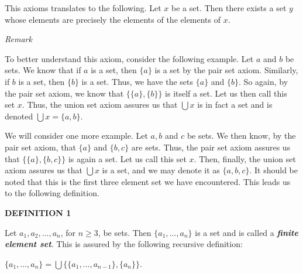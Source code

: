 \documentclass[12pt, a4paper]{article}
\begin{document}
\vspace{4mm}

\noindent This axioms translates to the following. Let $x$ be a set. Then there exists a set $y$ whose elements are precisely the elements of the elements of $x$.\par

\vspace{6mm}

\noindent\large{\textit{Remark}}\normalsize\par

\vspace{4mm}

\noindent To better understand this axiom, consider the following example. Let $a$ and $b$ be sets. We know that if $a$ is a set, then $\{a\}$ is a set by the pair set axiom. Similarly, if $b$ is a set, then $\{b\}$ is a set. Thus, we have the sets $\{a\}$ and $\{b\}$. So again, by the pair set axiom, we know that $\{\{a\},\{b\}\}$ is itself a set. Let us then call this set $x$. Thus, the union set axiom assures us that $\bigcup x$ is in fact a set and is denoted $\bigcup x=\{a,b\}$.\par

\newpage

We will consider one more example. Let $a,b$ and $c$ be sets. We then know, by the pair set axiom, that $\{a\}$ and $\{b,c\}$ are sets. Thus, the pair set axiom assures us that $\{\{a\},\{b,c\}\}$ is again a set. Let us call this set $x$. Then, finally, the union set axiom assures us that $\bigcup x$ is a set, and we may denote it as $\{a,b,c\}$. It should be noted that this is the first three element set we have encountered. This leads us to the following definition.\par

\vspace{6mm}

\noindent\textbf{DEFINITION 1}\par

\vspace{4mm}

Let $a_1,a_2,\ldots, a_n$, for $n\geq 3$, be sets. Then $\{a_1,\ldots, a_n\}$ is a set and is called a \textbf{\textit{finite element set}}. This is assured by the following recursive definition:\par

\vspace{4mm}

\centerline{$\{a_1,\ldots, a_n\}=\bigcup\{\{a_1,\ldots,a_{n-1}\},\{a_n\}\}$.}\par
\end{document}
